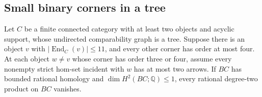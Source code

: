 \subsection{Small binary corners in a tree}

\begin{proposition}[Proved]
\label{CP2:A-tree-small-binary-corners}
Let $C$ be a finite connected category with at least two
objects and acyclic support, whose undirected comparability
graph is a tree. Suppose there is an object $v$ with
$|\operatorname{End}_C(v)|\leq11$, and every other corner
has order at most four. At each object $w\ne v$ whose
corner has order three or four, assume every nonempty
strict hom-set incident with $w$ has at most two arrows.
If $BC$ has bounded rational homology and
$\dim H^2(BC;\mathbb Q)\leq1$, every rational degree-two
product on $BC$ vanishes.
\end{proposition}
